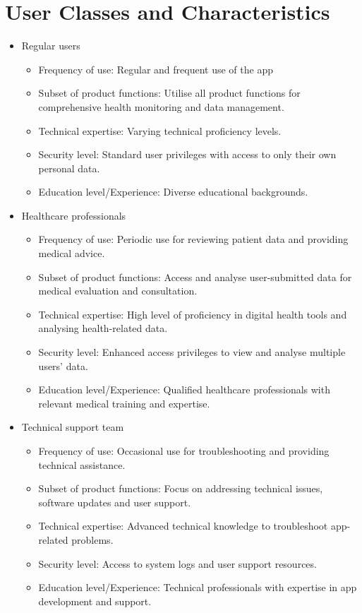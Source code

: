 \documentclass[a4paper]{scrreprt}
\begin{document}
\section{User Classes and Characteristics}
\begin{itemize}
    \item Regular users
    \begin{itemize}
        \item Frequency of use: Regular and frequent use of the app
        \item Subset of product functions: Utilise all product functions for comprehensive health monitoring and data management.
        \item Technical expertise: Varying technical proficiency levels.
        \item Security level: Standard user privileges with access to only their own personal data.
        \item Education level/Experience: Diverse educational backgrounds.
    \end{itemize}
    \item Healthcare professionals
    \begin{itemize}
        \item Frequency of use: Periodic use for reviewing patient data and providing medical advice.
        \item Subset of product functions: Access and analyse user-submitted data for medical evaluation and consultation.
        \item Technical expertise: High level of proficiency in digital health tools and analysing health-related data.
        \item Security level: Enhanced access privileges to view and analyse multiple users' data.
        \item Education level/Experience: Qualified healthcare professionals with relevant medical training and expertise.
    \end{itemize}
    \item Technical support team
    \begin{itemize}
        \item Frequency of use: Occasional use for troubleshooting and providing technical assistance.
        \item Subset of product functions: Focus on addressing technical issues, software updates and user support.
        \item Technical expertise: Advanced technical knowledge to troubleshoot app-related problems.
        \item Security level: Access to system logs and user support resources.
        \item Education level/Experience: Technical professionals with expertise in app development and support.
    \end{itemize}
\end{itemize}
\end{document}

